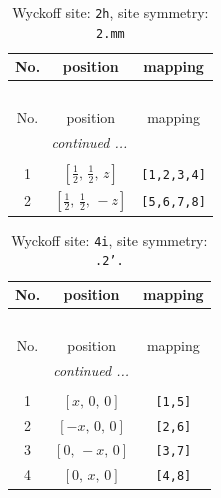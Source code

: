 \documentclass[fleqn,8pt]{jsarticle}
\begin{document}
\begin{longtable}{ccc}
\caption{Wyckoff site: {\tt 2h}, site symmetry: {\tt 2.mm}}
 \\
 \hline \hline
No. & position & mapping \\ \hline \endfirsthead

\multicolumn{2}{l}{\tablename\ \thetable{}} \\
 \hline \hline
No. & position & mapping \\ \hline \endhead

 \hline \hline
\multicolumn{2}{r}{\footnotesize\it continued ...} \\ \endfoot

 \hline \hline
\multicolumn{2}{r}{} \\ \endlastfoot

1 & $\left[ \frac{1}{2},\, \frac{1}{2},\, z \right]$ & {\tt [1,2,3,4]} \\ \hline
2 & $\left[ \frac{1}{2},\, \frac{1}{2},\, - z \right]$ & {\tt [5,6,7,8]} \\
\end{longtable}
\renewcommand{\arraystretch}{1.2}
\begin{longtable}{ccc}
\caption{Wyckoff site: {\tt 4i}, site symmetry: {\tt .2'.}}
 \\
 \hline \hline
No. & position & mapping \\ \hline \endfirsthead

\multicolumn{2}{l}{\tablename\ \thetable{}} \\
 \hline \hline
No. & position & mapping \\ \hline \endhead

 \hline \hline
\multicolumn{2}{r}{\footnotesize\it continued ...} \\ \endfoot

 \hline \hline
\multicolumn{2}{r}{} \\ \endlastfoot

1 & $\left[ x,\, 0,\, 0 \right]$ & {\tt [1,5]} \\ \hline
2 & $\left[ - x,\, 0,\, 0 \right]$ & {\tt [2,6]} \\ \hline
3 & $\left[ 0,\, - x,\, 0 \right]$ & {\tt [3,7]} \\ \hline
4 & $\left[ 0,\, x,\, 0 \right]$ & {\tt [4,8]} \\
\end{longtable}
\renewcommand{\arraystretch}{1.2}
\end{document}
